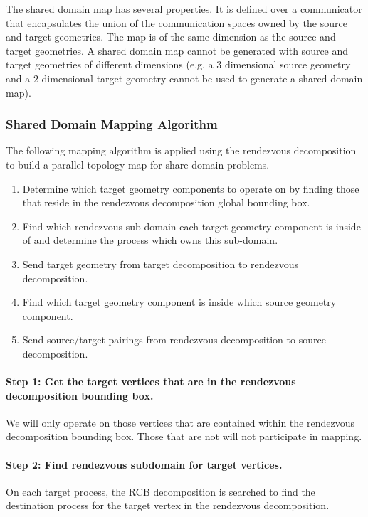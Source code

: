 \documentclass[letterpaper,12pt]{article}
\begin{document}
The shared domain map has several properties. It is defined over a
communicator that encapsulates the union of the communication spaces
owned by the source and target geometries.  The map is of the same
dimension as the source and target geometries. A shared domain map
cannot be generated with source and target geometries of different
dimensions (e.g. a 3 dimensional source geometry and a 2 dimensional
target geometry cannot be used to generate a shared domain map).

\subsubsection{Shared Domain Mapping Algorithm}
\label{subsubsec:shared_domain_alg}
The following mapping algorithm is applied using the rendezvous
decomposition to build a parallel topology map for share domain
problems.

\begin{enumerate}
\item Determine which target geometry components to operate on by
  finding those that reside in the rendezvous decomposition global
  bounding box.
\item Find which rendezvous sub-domain each target geometry component
  is inside of and determine the process which owns this sub-domain.
\item Send target geometry from target decomposition to rendezvous
  decomposition.
\item Find which target geometry component is inside which source
  geometry component.
\item Send source/target pairings from rendezvous decomposition to
  source decomposition.
\end{enumerate}

\paragraph{Step 1: Get the target vertices that are in the rendezvous
  decomposition bounding box.}  We will only operate on those vertices
that are contained within the rendezvous decomposition bounding
box. Those that are not will not participate in mapping.

\paragraph{Step 2: Find rendezvous subdomain for target vertices.}
On each target process, the RCB decomposition is searched to find the
destination process for the target vertex in the rendezvous
decomposition.
\end{document}
